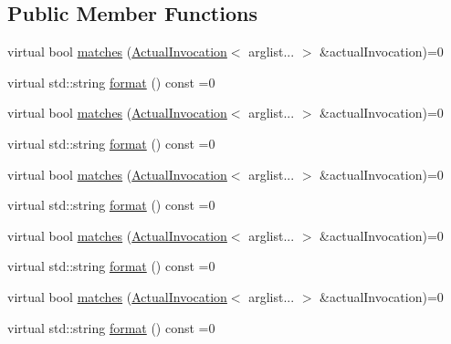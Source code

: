 \subsection*{Public Member Functions}
\begin{DoxyCompactItemize}
\item 
virtual bool \mbox{\hyperlink{structfakeit_1_1ActualInvocation_1_1Matcher_a7459c74697253717984b5e86c9e30ae6}{matches}} (\mbox{\hyperlink{structfakeit_1_1ActualInvocation}{Actual\+Invocation}}$<$ arglist... $>$ \&actual\+Invocation)=0
\item 
virtual std\+::string \mbox{\hyperlink{structfakeit_1_1ActualInvocation_1_1Matcher_ae19e50f7b3a2cd2a9d6670acbaa47c32}{format}} () const =0
\item 
virtual bool \mbox{\hyperlink{structfakeit_1_1ActualInvocation_1_1Matcher_a7459c74697253717984b5e86c9e30ae6}{matches}} (\mbox{\hyperlink{structfakeit_1_1ActualInvocation}{Actual\+Invocation}}$<$ arglist... $>$ \&actual\+Invocation)=0
\item 
virtual std\+::string \mbox{\hyperlink{structfakeit_1_1ActualInvocation_1_1Matcher_ae19e50f7b3a2cd2a9d6670acbaa47c32}{format}} () const =0
\item 
virtual bool \mbox{\hyperlink{structfakeit_1_1ActualInvocation_1_1Matcher_a7459c74697253717984b5e86c9e30ae6}{matches}} (\mbox{\hyperlink{structfakeit_1_1ActualInvocation}{Actual\+Invocation}}$<$ arglist... $>$ \&actual\+Invocation)=0
\item 
virtual std\+::string \mbox{\hyperlink{structfakeit_1_1ActualInvocation_1_1Matcher_ae19e50f7b3a2cd2a9d6670acbaa47c32}{format}} () const =0
\item 
virtual bool \mbox{\hyperlink{structfakeit_1_1ActualInvocation_1_1Matcher_a7459c74697253717984b5e86c9e30ae6}{matches}} (\mbox{\hyperlink{structfakeit_1_1ActualInvocation}{Actual\+Invocation}}$<$ arglist... $>$ \&actual\+Invocation)=0
\item 
virtual std\+::string \mbox{\hyperlink{structfakeit_1_1ActualInvocation_1_1Matcher_ae19e50f7b3a2cd2a9d6670acbaa47c32}{format}} () const =0
\item 
virtual bool \mbox{\hyperlink{structfakeit_1_1ActualInvocation_1_1Matcher_a7459c74697253717984b5e86c9e30ae6}{matches}} (\mbox{\hyperlink{structfakeit_1_1ActualInvocation}{Actual\+Invocation}}$<$ arglist... $>$ \&actual\+Invocation)=0
\item 
virtual std\+::string \mbox{\hyperlink{structfakeit_1_1ActualInvocation_1_1Matcher_ae19e50f7b3a2cd2a9d6670acbaa47c32}{format}} () const =0

\end{DoxyCompactItemize}
